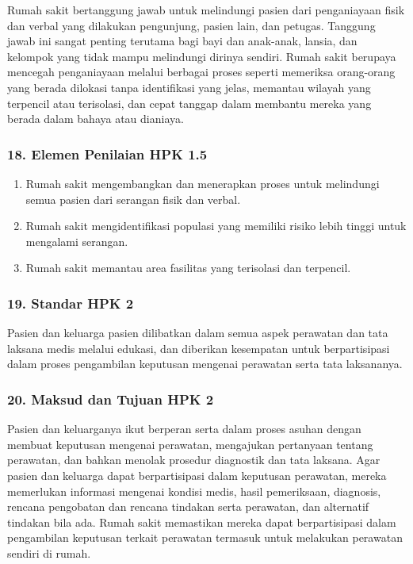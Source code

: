 \documentclass[
]{book}
\providecommand{\tightlist}{%
  \setlength{\itemsep}{0pt}\setlength{\parskip}{0pt}}
\begin{document}
Rumah sakit bertanggung jawab untuk melindungi pasien dari penganiayaan fisik dan verbal yang dilakukan pengunjung, pasien lain, dan petugas. Tanggung jawab ini sangat penting terutama bagi bayi dan anak-anak, lansia, dan kelompok yang tidak mampu melindungi dirinya sendiri. Rumah sakit berupaya mencegah penganiayaan melalui berbagai proses seperti memeriksa orang-orang yang berada dilokasi tanpa identifikasi yang jelas, memantau wilayah yang terpencil atau terisolasi, dan cepat tanggap dalam membantu mereka yang berada dalam bahaya atau dianiaya.

\hypertarget{elemen-penilaian-hpk-1.5}{%
\subsubsection*{18. Elemen Penilaian HPK 1.5}\label{elemen-penilaian-hpk-1.5}}

\begin{enumerate}
\def\labelenumi{\alph{enumi}.}
\tightlist
\item
  Rumah sakit mengembangkan dan menerapkan proses untuk melindungi semua pasien dari serangan fisik dan verbal.
\item
  Rumah sakit mengidentifikasi populasi yang memiliki risiko lebih tinggi untuk mengalami serangan.
\item
  Rumah sakit memantau area fasilitas yang terisolasi dan terpencil.
\end{enumerate}

\hypertarget{standar-hpk-2}{%
\subsubsection*{19. Standar HPK 2}\label{standar-hpk-2}}

Pasien dan keluarga pasien dilibatkan dalam semua aspek perawatan dan tata laksana medis melalui edukasi, dan diberikan kesempatan untuk berpartisipasi dalam proses pengambilan keputusan mengenai perawatan serta tata laksananya.

\hypertarget{maksud-dan-tujuan-hpk-2}{%
\subsubsection*{20. Maksud dan Tujuan HPK 2}\label{maksud-dan-tujuan-hpk-2}}

Pasien dan keluarganya ikut berperan serta dalam proses asuhan dengan membuat keputusan mengenai perawatan, mengajukan pertanyaan tentang perawatan, dan bahkan menolak prosedur diagnostik dan tata laksana. Agar pasien dan keluarga dapat berpartisipasi dalam keputusan perawatan, mereka memerlukan informasi mengenai kondisi medis, hasil pemeriksaan, diagnosis, rencana pengobatan dan rencana tindakan serta perawatan, dan alternatif tindakan bila ada. Rumah sakit memastikan mereka dapat berpartisipasi dalam pengambilan keputusan terkait perawatan termasuk untuk melakukan perawatan sendiri di rumah.
\end{document}

